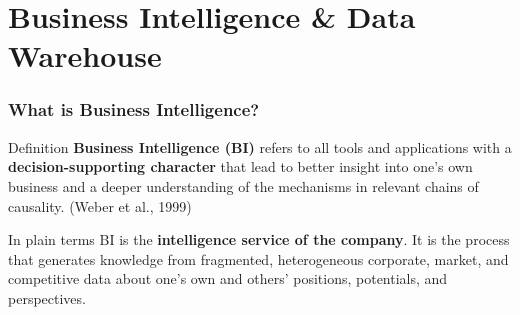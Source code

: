 \section{Business Intelligence \& Data Warehouse}


\begin{frame}
  \frametitle{What is Business Intelligence?}

  \begin{block}{Definition}
    \textbf{Business Intelligence (BI)} refers to all tools and applications with
    a \textbf{decision-supporting character} that lead to better insight into
    one's own business and a deeper understanding of the mechanisms in relevant
    chains of causality.
    \hfill\small(Weber et al., 1999)
  \end{block}

  \vspace{0.4em}
  \begin{block}{In plain terms}
    BI is the \textbf{intelligence service of the company}. It is the process
    that generates knowledge from fragmented, heterogeneous corporate, market,
    and competitive data about one's own and others' positions, potentials,
    and perspectives.
  \end{block}
\end{frame}

